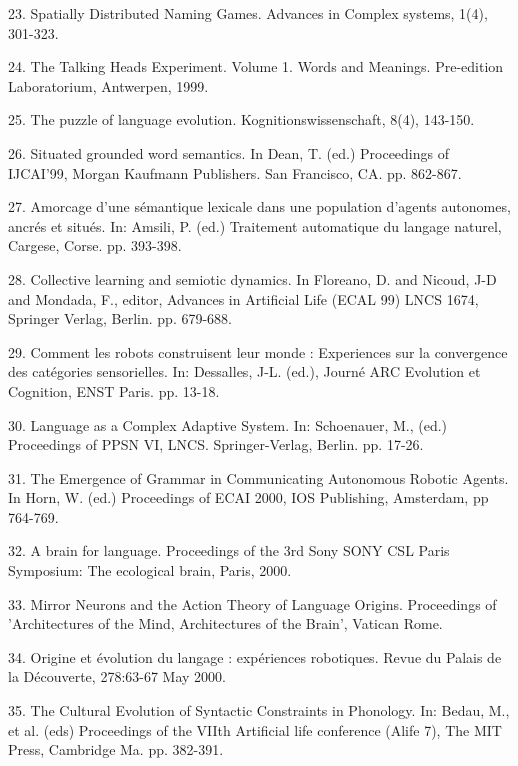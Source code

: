 23. \citet{Steels:99c} Spatially Distributed Naming Games. Advances in Complex systems, 1(4), 301-323. 

24. \citet{Steels:99d} The Talking Heads Experiment. Volume 1. Words and Meanings. Pre-edition Laboratorium, Antwerpen, 1999.

25. \citet{Steels:99e} The puzzle of language evolution. Kognitionswissenschaft, 8(4), 143-150. 

26. \citet{Steels:99f} Situated grounded word semantics. In Dean, T. (ed.) Proceedings of IJCAI'99, 
Morgan Kaufmann Publishers. San Francisco, CA. pp. 862-867. 

27. \citet{Steels:99g} Amorcage d'une s\'emantique lexicale dans une population d'agents autonomes, ancr\'es et 
situ\'es. In: Amsili, P. (ed.) Traitement automatique du langage naturel, Cargese, Corse. pp. 393-398. 

28. \citet{Steels:99h} Collective learning and semiotic dynamics. In Floreano, D. and 
Nicoud, J-D and Mondada, F., editor, Advances in Artificial Life (ECAL 99) LNCS 1674, Springer Verlag, Berlin. 
pp. 679-688. 

\enlargethispage{1\baselineskip}
29. \citet{Kaplan:00a} Comment les robots construisent leur monde : Experiences sur la convergence des cat\'egories sensorielles. In: Dessalles, J-L. (ed.), Journ\'e ARC Evolution et Cognition, ENST Paris. pp. 13-18. 

30. \citet{Steels:00b} Language as a Complex Adaptive System. In: Schoenauer, M., (ed.) Proceedings of PPSN VI, LNCS. Springer-Verlag, Berlin. pp. 17-26. 

31. \citet{Steels:00c} The Emergence of Grammar in Communicating Autonomous Robotic Agents. In Horn, W. (ed.) Proceedings of ECAI 2000, 
IOS Publishing, Amsterdam, pp 764-769. 

32. \citet{Steels:00d} A brain for language. Proceedings of the 3rd Sony SONY CSL Paris Symposium: The ecological brain, Paris, 2000.

33. \citet{Steels:00e} Mirror Neurons and the Action Theory of Language Origins. Proceedings of 'Architectures of the Mind, Architectures of the Brain', Vatican Rome. 

34.\citet{Steels:00f} Origine et \'evolution du langage : exp\'eriences robotiques. Revue du Palais de la D\'ecouverte, 278:63-67 May 2000.

35. \citet{Steels:00g} The Cultural Evolution of Syntactic Constraints in Phonology. In: Bedau, M., et al.
(eds) Proceedings of the VIIth Artificial life conference (Alife 7), The MIT Press, Cambridge Ma. pp. 382-391. 

